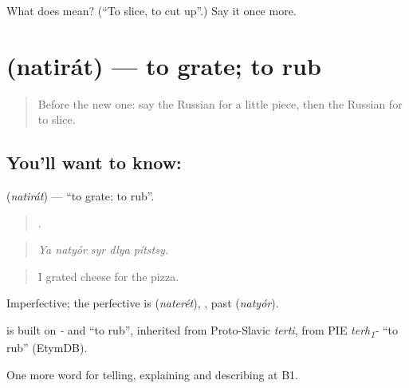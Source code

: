 \begin{tcolorbox}[breakable,colback=teal!4,colframe=teal!35!black,title={Before you move on}]
What does  mean? (\textquotedblleft{}To slice, to cut up\textquotedblright{}.) Say it once more.
\end{tcolorbox}
\section[\texorpdfstring{\ru{натирать} (natirát)}{натирать (natirát)}]{ (natirát) — to grate; to rub}

\label{lesson:RU-C328-natirat}



\begin{quote}
Before the new one: say the Russian for a little piece, then the Russian for to slice.
\end{quote}

\subsection*{You'll want to know: }
\textbf{} (\emph{natirát}) — \textquotedblleft{}to grate; to rub\textquotedblright{}.

\begin{quote}
    .
\end{quote}

\begin{quote}
\emph{Ya natyór syr dlya pítstsy.}
\end{quote}

\begin{quote}
I grated cheese for the pizza.
\end{quote}

Imperfective; the perfective is \emph{} (\emph{naterét}), \emph{}, past \emph{} (\emph{natyór}).

\begin{cousinweb}
\emph{} is built on \emph{-} and \emph{} \textquotedblleft{}to rub\textquotedblright{}, inherited from Proto-Slavic \emph{terti}, from PIE \emph{terh\textsubscript{1}-} \textquotedblleft{}to rub\textquotedblright{} (EtymDB).
\end{cousinweb}

\begin{grammarlens}[title={What you've built}]
One more word for telling, explaining and describing at B1.
\end{grammarlens}

